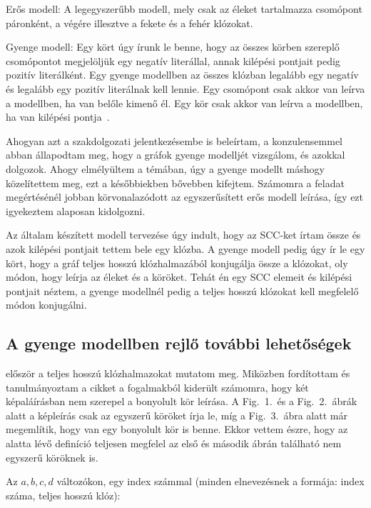 \documentclass[
]{thesis-ekf}
\theoremstyle{definition}
\theoremstyle{remark}
\begin{document}
	Erős modell: A legegyszerűbb modell, mely csak az éleket tartalmazza csomópont páronként, a végére illesztve a fekete és a fehér klózokat.
	
	Gyenge modell: Egy kört úgy írunk le benne, hogy az összes körben szereplő csomópontot megjelöljük egy negatív literállal, annak kilépési pontjait pedig pozitív literálként. Egy gyenge modellben az összes klózban legalább egy negatív és legalább egy pozitív literálnak kell lennie. Egy csomópont csak akkor van leírva a modellben, ha van belőle kimenő él. Egy kör csak akkor van leírva a modellben, ha van kilépési pontja~\cite{sat-solving-50}.
	
	Ahogyan azt a szakdolgozati jelentkezésembe is beleírtam, a konzulensemmel abban állapodtam meg, hogy a gráfok gyenge modelljét vizsgálom, és azokkal dolgozok. Ahogy elmélyültem a témában, úgy a gyenge modellt máshogy közelítettem meg, ezt a későbbiekben bővebben kifejtem. Számomra a feladat megértésénél jobban körvonalazódott az egyszerűsített erős modell leírása, így ezt igyekeztem alaposan kidolgozni.
	
	Az általam készített modell tervezése úgy indult, hogy az \textsc{SCC}-ket írtam össze és azok kilépési pontjait tettem bele egy klózba. A gyenge modell pedig úgy ír le egy kört, hogy a gráf teljes hosszú klózhalmazából konjugálja össze a klózokat, oly módon, hogy leírja az éleket és a köröket. Tehát én egy \textsc{SCC} elemeit és kilépési pontjait néztem, a gyenge modellnél pedig a teljes hosszú klózokat kell megfelelő módon konjugálni.
	
		\subsection{A gyenge modellben rejlő további lehetőségek}
	
	\cite[Kusper Gábor és társai cikkjéből]{am} először a teljes hosszú klózhalmazokat mutatom meg. Miközben fordítottam és tanulmányoztam a cikket a fogalmakból kiderült számomra, hogy két képaláírásban nem szerepel a bonyolult kör leírása. A Fig.~1.~és a Fig.~2.~ábrák alatt a képleírás csak az egyszerű köröket írja le, míg a Fig.~3.~ábra alatt már megemlítik, hogy van egy bonyolult kör is benne. Ekkor vettem észre, hogy az alatta lévő definíció teljesen megfelel az első és második ábrán található nem egyszerű köröknek is.
	
	Az $ {a,b,c,d} $ változókon, egy index számmal (minden elnevezésnek a formája: index száma, teljes hosszú klóz):
	
\end{document}
